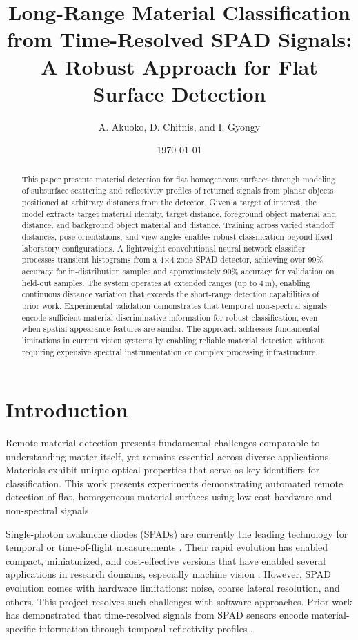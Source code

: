\documentclass[10pt,twocolumn]{article}
\title{Long-Range Material Classification from Time-Resolved SPAD Signals: A Robust Approach for Flat Surface Detection}
\author{A. Akuoko, D. Chitnis, and I. Gyongy}
\date{\today}
\begin{document}
\maketitle

\begin{abstract}
This paper presents material detection for flat homogeneous surfaces through modeling of subsurface scattering and reflectivity profiles of returned signals from planar objects positioned at arbitrary distances from the detector. Given a target of interest, the model extracts target material identity, target distance, foreground object material and distance, and background object material and distance. Training across varied standoff distances, pose orientations, and view angles enables robust classification beyond fixed laboratory configurations. A lightweight convolutional neural network classifier processes transient histograms from a 4$\times$4 zone SPAD detector, achieving over 99\% accuracy for in-distribution samples and approximately 90\% accuracy for validation on held-out samples. The system operates at extended ranges (up to 4\,m), enabling continuous distance variation that exceeds the short-range detection capabilities of prior work. Experimental validation demonstrates that temporal non-spectral signals encode sufficient material-discriminative information for robust classification, even when spatial appearance features are similar. The approach addresses fundamental limitations in current vision systems by enabling reliable material detection without requiring expensive spectral instrumentation or complex processing infrastructure.
\end{abstract}

\section{Introduction}

Remote material detection presents fundamental challenges comparable to understanding matter itself, yet remains essential across diverse applications. Materials exhibit unique optical properties that serve as key identifiers for classification. This work presents experiments demonstrating automated remote detection of flat, homogeneous material surfaces using low-cost hardware and non-spectral signals.

Single-photon avalanche diodes (SPADs) are currently the leading technology for temporal or time-of-flight measurements \cite{piron2020,gyongy2022}. Their rapid evolution has enabled compact, miniaturized, and cost-effective versions that have enabled several applications in research domains, especially machine vision \cite{fasolino2024}. However, SPAD evolution comes with hardware limitations: noise, coarse lateral resolution, and others. This project resolves such challenges with software approaches. Prior work has demonstrated that time-resolved signals from SPAD sensors encode material-specific information through temporal reflectivity profiles \cite{su2016,becker2023,tafone2023}.
\end{document}
